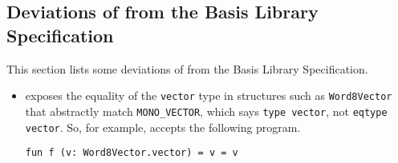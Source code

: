 \subsection{Deviations of {\smlnj} from the Basis Library Specification}
%
This section lists some deviations of {\smlnj} from the Basis Library
Specification. 
\begin{itemize}
\item
{\smlnj} exposes the equality of the {\tt vector} type in structures
such as {\tt Word8Vector} that abstractly match {\tt MONO\_VECTOR},
which says {\tt type vector}, not {\tt eqtype vector}.  So, for
example, {\smlnj} accepts the following program.
\begin{verbatim}
fun f (v: Word8Vector.vector) = v = v
\end{verbatim}
\end{itemize}
